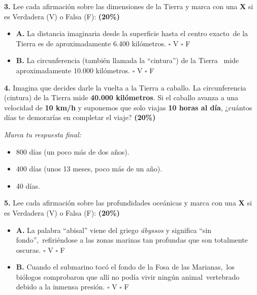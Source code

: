 \documentclass[12pt, letterpaper]{article}
\begin{document}
	\vspace{0.5cm}
	
	\noindent \textbf{3.} Lee cada afirmación sobre las dimensiones de la Tierra y marca con una \textbf{X} si es Verdadera (V) o Falsa (F): \hfill\textbf{(20\%)}
	
	\vspace{0.3cm} 
	\begin{itemize}[itemsep=0.6cm, label={}] 
		\item \textbf{A.} La distancia imaginaria desde la superficie hasta el centro exacto\ de la Tierra es de aproximadamente 6.400 kilómetros. \hfill  $\square$  V \quad  $\square$  F 
		
		\item \textbf{B.} La circunferencia (también llamada la ``cintura'') de la Tierra \ mide aproximadamente 10.000 kilómetros. \hfill  $\square$  V \quad  $\square$  F 
	\end{itemize}
	
	\newpage
	
	\noindent \textbf{4.} Imagina que decides darle la vuelta a la Tierra a caballo. La circunferencia (cintura) de la Tierra mide \textbf{40.000 kilómetros}. Si el caballo avanza a una velocidad de \textbf{10 km/h} y suponemos que solo viajas \textbf{10 horas al día}, ¿cuántos días te demorarías en completar el viaje? \hfill\textbf{(20\%)}
	
	\noindent \textit{Marca tu respuesta final:}
	\begin{itemize}[itemsep=0.4cm, label={}] 
		\item[ $\square$ ] 800 días (un poco más de dos años). 
		\item[ $\square$ ] 400 días (unos 13 meses, poco más de un año).
		\item[ $\square$ ] 40 días. 
	\end{itemize}
	
	\vspace{0.5cm}
	
	\noindent \textbf{5.} Lee cada afirmación sobre las profundidades oceánicas y marca con una \textbf{X} si es Verdadera (V) o Falsa (F): \hfill\textbf{(20\%)}
	
	\vspace{0.3cm} 
	\begin{itemize}[itemsep=0.6cm, label={}] 
		\item \textbf{A.} La palabra ``abisal'' viene del griego \textit{ábyssos} y significa ``sin fondo'',\ refiriéndose a las zonas marinas tan profundas que son totalmente oscuras. \hfill  $\square$  V \quad  $\square$  F 
		
		\item \textbf{B.} Cuando el submarino tocó el fondo de la Fosa de las Marianas,\ los biólogos comprobaron que allí no podía vivir ningún animal\ vertebrado debido a la inmensa presión. \hfill  $\square$  V \quad  $\square$  F 
	\end{itemize}
	
	
\end{document}
